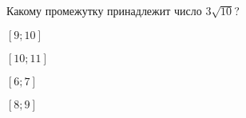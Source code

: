 \begin{ex}
	Какому промежутку принадлежит число $3\sqrt{10}$?
	
	\selectanswer
	\begin{enumcols}[columns=4]
		\item $[9;10]$
		\item $[10;11]$
		\item $[6;7]$
		\item $[8;9]$
	\end{enumcols}
\end{ex}